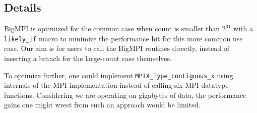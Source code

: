 \begin{comment}

\texttt{MPIX\_Type\_contiguous\_x}
does the heavy lifting.  It's pretty obvious how it works.
A quality datatype engine will turn this into a contiguous datatype internally 
and thus the underlying communication will be efficient.  
This approach assumes a count-safe MPI implementation, but implementations need
to be count-safe period if the Forum is serious about datatypes being
the solution rather than \texttt{MPI\_Count} everywhere.

All of the communication functions follow the same pattern, demonstrated in
Figure~\ref{code:mpi_send_x}.
\end{comment}


\subsection{Details}

BigMPI is optimized for the common case when count is smaller than $2^{31}$
with a \texttt{likely\_if} macro to minimize the performance hit for
this more common use case.  Our aim is for users to call the BigMPI routines
directly, instead of inserting a branch for the large-count case themselves.

To optimize further, one could implement
\texttt{MPIX\_Type\_contiguous\_x} using internals of the MPI implementation
instead of calling six MPI datatype functions.  Considering we are operating on
gigabytes of data, the performance gains one might wrest from such an approach
would be limited.


